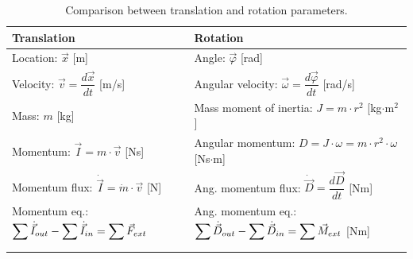 \documentclass{article}
\begin{document}
\vspace*{.5cm}
\begin{table}[ht!]
    \centering
    \caption{Comparison between translation and rotation parameters.}
    \renewcommand{\arraystretch}{2.5}
    \begin{tabular}{l|l}
        \hline
        Translation & Rotation \\
        \hline
        Location: $\vec{x}$ [m] & Angle: $\vec{\varphi}$ [rad] \\
        Velocity: $\vec{v} = \dfrac{d\vec{x}}{dt}$ [m/s] & Angular velocity: $\vec{\omega} = \dfrac{d\vec{\varphi}}{dt}$ [rad/s] \\
        Mass: $m$ [kg] & Mass moment of inertia: $J = m\cdot r^2$ [kg$\cdot$m$^2$] \\
        Momentum: $\vec{I} = m\cdot \vec{v}$ [Ns] & Angular momentum: $D = J\cdot\omega = m\cdot r^2 \cdot \omega$ [Ns$\cdot$m] \\
        Momentum flux: $\dot{\vec{I}} = \dot{m}\cdot\vec{v}$ [N] & Ang. momentum flux: $\dot{\vec{D}}=\dfrac{d\vec{D}}{dt}$ [Nm] \\
        Momentum eq.: $\displaystyle \sum_{}^{} \dot{\vec{I}}_{out} - \displaystyle \sum_{}^{} \dot{\vec{I}}_{in} = \displaystyle \sum_{}^{} \vec{F}_{ext}$ & Ang. momentum eq.: $\displaystyle \sum_{}^{} \dot{\vec{D}}_{out} - \displaystyle \sum_{}^{} \dot{\vec{D}}_{in} = \displaystyle \sum_{}^{} \vec{M}_{ext}$ [Nm] \\
        \hline
    \end{tabular}
\end{table}

\newpage
\end{document}
